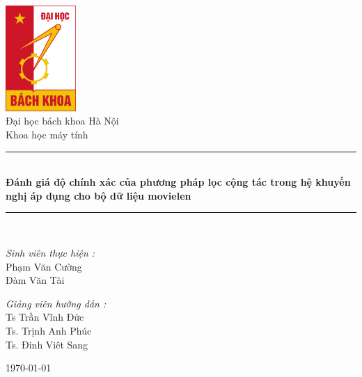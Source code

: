 \documentclass[a4paper,12pt]{book}
\theoremstyle{break}
\begin{document}

\begin{titlepage}
\begin{center}

\includegraphics[width=0.2\textwidth]{bk}\\[1cm]

{\large Đại học bách khoa Hà Nội}\\[0.5cm]

{\large Khoa học máy tính}\\[0.5cm]

\rule{\linewidth}{0.5mm} \\[0.4cm]
{ \huge \bfseries Đánh giá độ chính xác của phương pháp lọc cộng tác trong hệ khuyến nghị áp dụng cho bộ dữ liệu movielen \\[0.4cm] }
\rule{\linewidth}{0.5mm} \\[1.5cm]

\noindent
\begin{minipage}{0.4\textwidth}
  \begin{flushleft} \large
    \emph{Sinh viên thực hiện :}\\
    Phạm Văn Cường \\
    Đàm Văn Tài
  \end{flushleft}
\end{minipage}%
\begin{minipage}{0.4\textwidth}
  \begin{flushleft} \large
    \emph{Giảng viên hướng dẫn :} \\
    Ts Trần Vĩnh Đức \\
    Ts. Trịnh Anh Phúc \\
    Ts. Đinh Viêt Sang
  \end{flushleft}
\end{minipage}

\vfill

{\today}

\end{center}
\end{titlepage}
\end{document}
